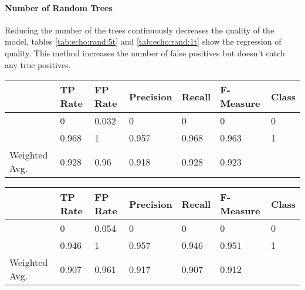 \documentclass[paper=a4, fontsize=11pt]{scrartcl} %
\numberwithin{equation}{section} %
\numberwithin{figure}{section} %
\numberwithin{table}{section} %
\begin{document}
\paragraph{Number of Random Trees}
Reducing the number of the trees continuously decreases the quality of the model, tables \ref{tab:echo:rand:5t} and \ref{tab:echo:rand:1t} show the regression of quality.
This method increases the number of false positives but doesn't catch any true positives.
\begin{table*}[htb]\centering
    \begin{tabular*}{\columnwidth}{@{}lllllll@{}}
        \toprule 
               &  TP Rate & FP Rate & Precision & Recall & F-Measure &   Class  \\ \midrule
               &  0       & 0.032   & 0         & 0      & 0         &   0      \\
               &  0.968   & 1       & 0.957     & 0.968  & 0.963     &   1      \\     
Weighted Avg.  &  0.928   & 0.96    & 0.918     & 0.928  & 0.923     &          \\ \bottomrule
    \end{tabular*}
\caption{Random Forest -- 5 Random Trees} 
\label{tab:echo:rand:5t}
\end{table*}
\FloatBarrier

\begin{table*}[htb]\centering
    \begin{tabular*}{\columnwidth}{@{}lllllll@{}}
        \toprule 
               &  TP Rate & FP Rate & Precision & Recall & F-Measure &   Class \\ \midrule
               &  0       & 0.054   & 0         & 0      & 0         &   0     \\ 
               &  0.946   & 1       & 0.957     & 0.946  & 0.951     &   1     \\ 
Weighted Avg.  &  0.907   & 0.961   & 0.917     & 0.907  & 0.912     &         \\ \bottomrule
    \end{tabular*}
\caption{Random Forest -- 1 Random Tree} 
\label{tab:echo:rand:1t}
\end{table*}
\FloatBarrier
\end{document}
